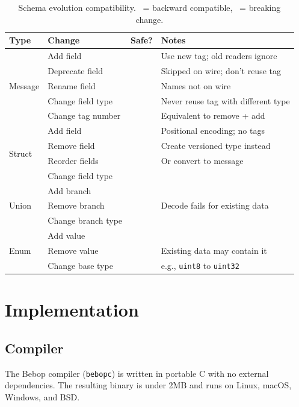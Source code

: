\documentclass[11pt,onecolumn]{article}
\newcommand{\cmark}{\ding{51}}
\newcommand{\xmark}{\ding{55}}
\begin{document}
\begin{table}[ht]
\centering
\small
\begin{tabular}{@{}llcl@{}}
\toprule
\textbf{Type} & \textbf{Change} & \textbf{Safe?} & \textbf{Notes} \\
\midrule
\multirow{5}{*}{Message}
  & Add field & \cmark & Use new tag; old readers ignore \\
  & Deprecate field & \cmark & Skipped on wire; don't reuse tag \\
  & Rename field & \cmark & Names not on wire \\
  & Change field type & \xmark & Never reuse tag with different type \\
  & Change tag number & \xmark & Equivalent to remove + add \\
\midrule
\multirow{4}{*}{Struct}
  & Add field & \xmark & Positional encoding; no tags \\
  & Remove field & \xmark & Create versioned type instead \\
  & Reorder fields & \xmark & Or convert to message \\
  & Change field type & \xmark & \\
\midrule
\multirow{3}{*}{Union}
  & Add branch & \cmark & \\
  & Remove branch & \xmark & Decode fails for existing data \\
  & Change branch type & \xmark & \\
\midrule
\multirow{3}{*}{Enum}
  & Add value & \cmark & \\
  & Remove value & \xmark & Existing data may contain it \\
  & Change base type & \xmark & e.g., \texttt{uint8} to \texttt{uint32} \\
\bottomrule
\end{tabular}
\caption{Schema evolution compatibility. \cmark\ = backward compatible, \xmark\ = breaking change.}
\end{table}


\newpage
\section{Implementation}

\subsection{Compiler}

The Bebop compiler (\texttt{bebopc}) is written in portable C with no external dependencies. The resulting binary is under 2MB and runs on Linux, macOS, Windows, and BSD.
\end{document}
